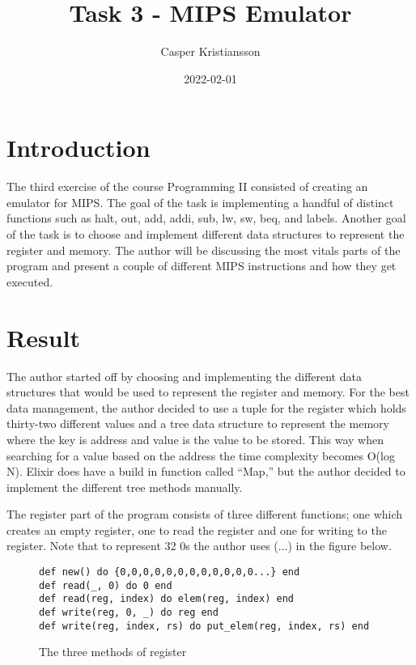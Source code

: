 \documentclass[a4paper,11pt]{article}
\begin{document}
\title{
    \textbf{Task 3 - MIPS Emulator}
}
\author{Casper Kristiansson}
\date{2022-02-01}

\maketitle

\section*{Introduction}
The third exercise of the course Programming II consisted of creating an emulator for MIPS. The goal of the task is implementing a handful of distinct functions such as halt, out, add, addi, sub, lw, sw, beq, and labels. Another goal of the task is to choose and implement different data structures to represent the register and memory. The author will be discussing the most vitals parts of the program and present a couple of different MIPS instructions and how they get executed.

\section*{Result}
The author started off by choosing and implementing the different data structures that would be used to represent the register and memory. For the best data management, the author decided to use a tuple for the register which holds thirty-two different values and a tree data structure to represent the memory where the key is address and value is the value to be stored. This way when searching for a value based on the address the time complexity becomes O(log N). Elixir does have a build in function called “Map,” but the author decided to implement the different tree methods manually.

The register part of the program consists of three different functions; one which creates an empty register, one to read the register and one for writing to the register. Note that to represent 32 0s the author uses (...) in the figure below.

\begin{figure}[H]
\begin{verbatim}
def new() do {0,0,0,0,0,0,0,0,0,0,0,0...} end
def read(_, 0) do 0 end
def read(reg, index) do elem(reg, index) end
def write(reg, 0, _) do reg end
def write(reg, index, rs) do put_elem(reg, index, rs) end
\end{verbatim}
\caption{The three methods of register}
\label{Figure:1}
\end{figure}
\end{document}
